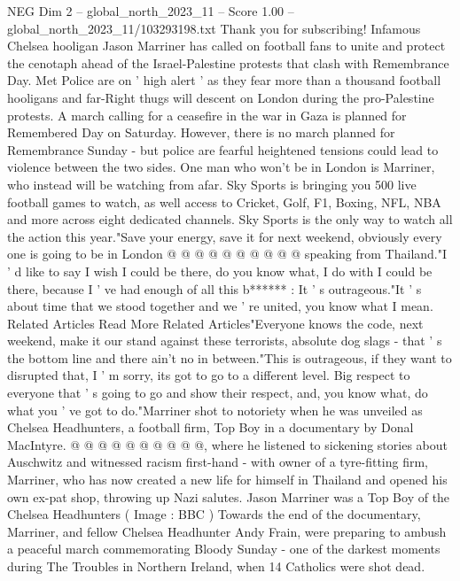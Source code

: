 \begin{textsample}{NEG Dim 2 – global\_north\_2023\_11 – Score 1.00 – global\_north\_2023\_11/103293198.txt}  \label{ex:f2_neg_209}
Thank you for subscribing!
Infamous Chelsea hooligan Jason Marriner has called on football fans to unite and protect the cenotaph ahead of the Israel-Palestine protests that clash with Remembrance Day.
Met Police are on ' high alert ' as they fear more than a thousand football hooligans and far-Right thugs will descent on London during the pro-Palestine protests.
A march calling for a ceasefire in the war in Gaza is planned for Remembered Day on Saturday.
However, there is no march planned for Remembrance Sunday - but police are fearful heightened tensions could lead to violence between the two sides.
One man who won't be in London is Marriner, who instead will be watching from afar.
Sky Sports is bringing you 500 live football games to watch, as well access to Cricket, Golf, F1, Boxing, NFL, NBA and more across eight dedicated channels.
Sky Sports is the only way to watch all the action this year."Save your energy, save it for next weekend, obviously every one is going to be in London @ @ @ @ @ @ @ @ @ @ speaking from Thailand."I ' d like to say I wish I could be there, do you know what, I do with I could be there, because I ' ve had enough of all this b****** : It ' s outrageous."It ' s about time that we stood together and we ' re united, you know what I mean.
Related Articles Read More Related Articles"Everyone knows the code, next weekend, make it our stand against these terrorists, absolute dog slags - that ' s the bottom line and there ain't no in between."This is outrageous, if they want to disrupted that, I ' m sorry, its got to go to a different level.
Big respect to everyone that ' s going to go and show their respect, and, you know what, do what you ' ve got to do."Marriner shot to notoriety when he was unveiled as Chelsea Headhunters, a football firm, Top Boy in a documentary by Donal MacIntyre. @ @ @ @ @ @ @ @ @ @, where he listened to sickening stories about Auschwitz and witnessed racism first-hand - with owner of a tyre-fitting firm, Marriner, who has now created a new life for himself in Thailand and opened his own ex-pat shop, throwing up Nazi salutes.
Jason Marriner was a Top Boy of the Chelsea Headhunters ( Image : BBC ) Towards the end of the documentary, Marriner, and fellow Chelsea Headhunter Andy Frain, were preparing to ambush a peaceful march commemorating Bloody Sunday - one of the darkest moments during The Troubles in Northern Ireland, when 14 Catholics were shot dead.

\end{textsample}
